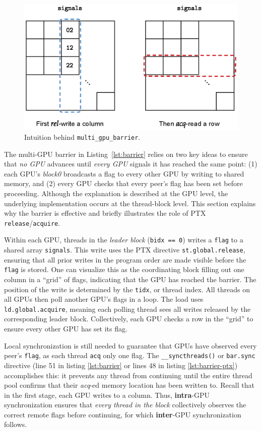 \documentclass[acmsmall]{acmart}
\begin{document}
\begin{figure}[H]
    \centering
    \includegraphics[width=0.7\linewidth]{images/intuition.eps}
    \caption{Intuition behind \texttt{multi\_gpu\_barrier}.}
    \label{fig:intuition}
\end{figure}

The multi-GPU barrier in Listing~\ref{lst:barrier} relies on two key ideas to ensure that \textit{no GPU} advances until \textit{every GPU} signals it has reached the same point: (1) each GPU’s \textit{block0} broadcasts a flag to every other GPU by writing to shared memory, and (2) every GPU checks that every peer’s flag has been set before proceeding. Although the explanation is described at the GPU level, the underlying implementation occurs at the thread-block level. This section explains why the barrier is effective and briefly illustrates the role of PTX \verb|release|/\verb|acquire|.

Within each GPU, threads in the \textit{leader block} (\texttt{bidx == 0}) writes a \texttt{flag} to a shared array \texttt{signals}. This write uses the PTX directive \texttt{st.global.release}, ensuring that all prior writes in the program order are made visible before the \texttt{flag} is stored. One can visualize this as the coordinating block filling out one column in a “grid” of flags, indicating that the GPU has reached the barrier. The position of the write is determined by the \texttt{tidx}, or thread index. All threads on all GPUs then poll another GPU’s flags in a loop. The load uses \texttt{ld.global.acquire}, meaning each polling thread sees all writes released by the corresponding leader block. Collectively, each GPU checks a row in the “grid” to ensure every other GPU has set its flag. 

Local synchronization is still needed to guarantee that GPUs have observed every peer’s \texttt{flag}, as each thread \texttt{acq} only one flag. The \texttt{\_\_syncthreads()} or \texttt{bar.sync} directive (line 51 in listing \ref{lst:barrier} or lines 48 in listing \ref{lst:barrier-ptx}) accomplishes this: it prevents any thread from continuing until the entire thread pool confirms that their \textit{acq}-ed memory location has been written to. Recall that in the first stage, each GPU writes to a column. Thus, \textbf{intra}-GPU synchronization ensures that \textit{every thread in the block} collectively observes the correct remote flags before continuing, for which \textbf{inter}-GPU synchronization follows.
\end{document}
